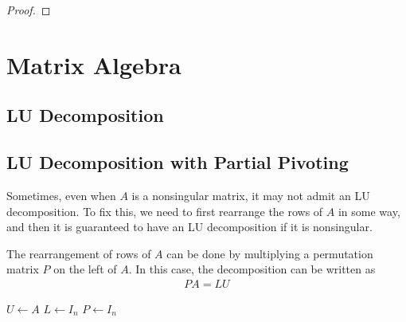 \documentclass[thmcnt=section, color=blue, 12pt]{my-elegantbook}
\begin{document}
\begin{proof}
\end{proof}


\chapter{Matrix Algebra}


\section{LU Decomposition}


\section{LU Decomposition with Partial Pivoting}


\par Sometimes, even when $A$ is a nonsingular matrix, it may not admit an LU decomposition. To fix this, we need to first rearrange the rows of $A$ in some way, and then it is guaranteed to have an LU decomposition if it is nonsingular.

\par The rearrangement of rows of $A$ can be done by multiplying a permutation matrix $P$ on the left of $A$. In this case, the decomposition can be written as 
\begin{align*}
    P A = L U
\end{align*}

\begin{algorithm}
    \caption{LU Decomposition with Partial Pivoting}\label{alg:1}
    $U \gets A$\;
    $L \gets I_n$\; 
    $P \gets I_n$\;
\end{algorithm}
    
\end{document}
